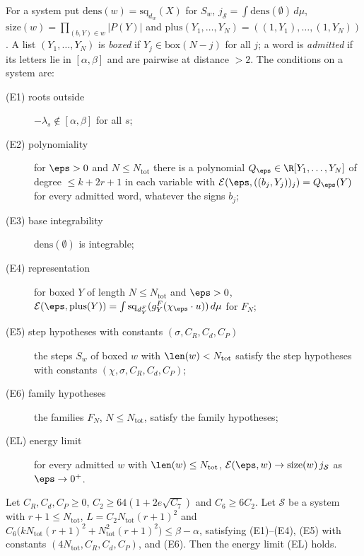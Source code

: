 \begin{definition}
For a system put $\mathrm{dens}(w)=\mathrm{sq}_{d_w}(X)$ for $S_w$, $j_{\mathcal S}=\int\mathrm{dens}(\emptyset)\,d\mu$,
$\mathrm{size}(w)=\prod_{(b,Y)\in w}|P(Y)|$ and $\mathrm{plus}(Y_1,\dots,Y_N)=((1,Y_1),\dots,(1,Y_N))$. A list
$(Y_1,\dots,Y_N)$ is \emph{boxed} if $Y_j\in\mathrm{box}(N-j)$ for all $j$; a word is \emph{admitted} if its letters lie in
$[\alpha,\beta]$ and are pairwise at distance $>2$. The conditions on a system are:
\begin{description}
\item[(E1) roots outside] $-\lambda_s\notin[\alpha,\beta]$ for all $s$;
\item[(E2) polynomiality] for $\eps>0$ and $N\le N_{\mathrm{tot}}$ there is a polynomial $Q_\eps\in\R[Y_1,\dots,Y_N]$ of
  degree $\le k+2r+1$ in each variable with $\thmScarrierEn(\eps,((b_j,Y_j))_j)=Q_\eps(Y)$ for every admitted word, whatever
  the signs $b_j$;
\item[(E3) base integrability] $\mathrm{dens}(\emptyset)$ is integrable;
\item[(E4) representation] for boxed $Y$ of length $N\le N_{\mathrm{tot}}$ and $\eps>0$,
  $\thmScarrierEn(\eps,\mathrm{plus}(Y))=\int\mathrm{sq}_{d^F_Y}(g^F_Y(\chi_\eps\cdot u))\,d\mu$ for $F_N$;
\item[(E5) step hypotheses with constants $(\sigma,C_R,C_d,C_P)$] the steps $S_w$ of boxed $w$ with $\len(w)<N_{\mathrm{tot}}$
  satisfy the step hypotheses with constants $(\chi,\sigma,C_R,C_d,C_P)$;
\item[(E6) family hypotheses] the families $F_N$, $N\le N_{\mathrm{tot}}$, satisfy the family hypotheses;
\item[(EL) energy limit] for every admitted $w$ with $\len(w)\le N_{\mathrm{tot}}$, $\thmScarrierEn(\eps,w)\to\mathrm{size}(w)\,
  j_{\mathcal S}$ as $\eps\to0^+$.
\end{description}
\end{definition}

\begin{theorem}\label{pf:thmS-carrier:LE}
Let $C_R,C_d,C_P\ge0$, $C_2\ge64(1+2e\sqrt{C_7})$ and $C_6\ge6C_2$. Let $\mathcal S$ be a system with $r+1\le N_{\mathrm{tot}}$,
$L=C_2N_{\mathrm{tot}}(r+1)^2$ and $C_6\bigl(kN_{\mathrm{tot}}(r+1)^2+N_{\mathrm{tot}}^2(r+1)^2\bigr)\le\beta-\alpha$, satisfying
(E1)--(E4), (E5) with constants $(4N_{\mathrm{tot}},C_R,C_d,C_P)$, and (E6). Then the energy limit (EL) holds.
\end{theorem}

